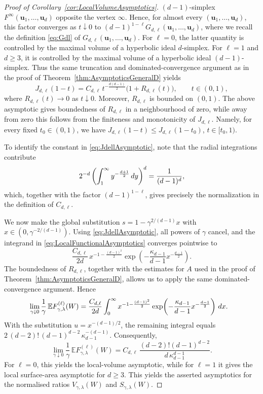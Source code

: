 \documentclass[10pt,a4paper]{amsart}
\def\EE{\mathbb{E}}
\newcommand{\bu}{\boldsymbol{u}}
\newcommand{\dint}{\textup{d}}
\begin{document}
\begin{proof}[Proof of Corollary~\ref{cor:LocalVolumeAsymptotics}]
	$(d-1)$-simplex $F^\infty(\bu_1,\ldots,\bu_d)$ opposite the
	vertex $\infty$. Hence, for almost every
	$(\bu_1,\ldots,\bu_d)$, this factor converges as
	$t\downarrow0$ to $(d-1)^{1-\ell}G_{d,\ell}(\bu_1,\ldots,\bu_d)$, where we recall the definition \eqref{eq:Gdl} of $G_{d,\ell}(\bu_1,\ldots,\bu_d)$. For $\ell=0$, the latter quantity is controlled by the maximal volume
	of a hyperbolic ideal $d$-simplex. For $\ell=1$ and $d\ge3$, it is
	controlled by the maximal volume of a hyperbolic ideal
	$(d-1)$-simplex. Thus the same truncation and dominated-convergence
	argument as in the proof of
	Theorem~\ref{thm:AsymptoticsGeneralD} yields
	\begin{equation}\label{eq:JdellAsymptotic}
		J_{d,\ell}(1-t)
		=
		C_{d,\ell}\,
		t^{-\frac{d(d-1)}2}
		\bigl(1+R_{d,\ell}(t)\bigr),
		\qquad t\in(0,1),
	\end{equation}
	where \(R_{d,\ell}(t)\to0\) as \(t\downarrow0\). Moreover,
	\(R_{d,\ell}\) is bounded on \((0,1)\). The above asymptotic gives
	boundedness of $R_{d,\ell}$ in a neighbourhood of zero, while away from zero this follows
	from the finiteness and monotonicity of \(J_{d,\ell}\). Namely, for every
	fixed \(t_0\in(0,1)\), we have $J_{d,\ell}(1-t)\le J_{d,\ell}(1-t_0)$, $t\in[t_0,1)$.

	To identify the constant in \eqref{eq:JdellAsymptotic}, note that the radial
	integrations contribute
	\[
		2^{-d}
		\left(
		\int_1^\infty y^{-\frac{d+1}{2}}\,\dint y
		\right)^d
		=
		\frac{1}{(d-1)^d},
	\]
	which, together with the factor $(d-1)^{1-\ell}$, gives precisely
	the normalization in the definition of $C_{d,\ell}$.

	We now make the global substitution $s=1-\gamma^{2/(d-1)}x$ with $x\in(0,\gamma^{-2/(d-1)})$.
	Using \eqref{eq:JdellAsymptotic}, all powers of $\gamma$ cancel, and
	the integrand in \eqref{eq:LocalFunctionalAsymptotics} converges
	pointwise to
	\[
		\frac{C_{d,\ell}}{2d}\,
		x^{-1-\frac{(d-1)^2}{2}}
		\exp\!\left(
		-\frac{\kappa_{d-1}}{d-1}
		x^{-\frac{d-1}{2}}
		\right).
	\]
	The boundedness of \(R_{d,\ell}\), together with the estimates for
	\(A\) used in the proof of Theorem~\ref{thm:AsymptoticsGeneralD},
	allows us to apply the same dominated-convergence argument.
	Hence
	\begin{align*}
		 & \lim_{\gamma\downarrow0}
		\frac{1}{\gamma}\,
		\EE F_{\gamma,\lambda}^{(\ell)}(W)
		=
		\frac{C_{d,\ell}}{2d}
		\int_0^\infty
		x^{-1-\frac{(d-1)^2}{2}}
		\exp\!\left(
		-\frac{\kappa_{d-1}}{d-1}
		x^{-\frac{d-1}{2}}
		\right)
		\,\dint x.
	\end{align*}
	With the substitution $u=x^{-(d-1)/2}$, the remaining integral
	equals $2\,(d-2)!\,(d-1)^{d-2}\,\kappa_{d-1}^{-(d-1)}$.
	Consequently,
	\[
		\lim_{\gamma\downarrow0}
		\frac{1}{\gamma}\,
		\EE F_{\gamma,\lambda}^{(\ell)}(W)
		=
		C_{d,\ell}\,
		\frac{(d-2)!(d-1)^{d-2}}{d\,\kappa_{d-1}^{d-1}}.
	\]
	For $\ell=0$, this yields the local-volume asymptotic, while for
	$\ell=1$ it gives the local surface-area asymptotic for $d\ge3$.
	This yields the asserted
	asymptotics for the normalised ratios
	$V_{\gamma,\lambda}(W)$ and
	$S_{\gamma,\lambda}(W)$.


\end{proof}
\end{document}
